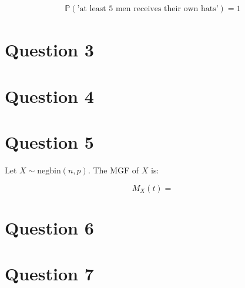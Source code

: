 \documentclass[12pt]{article}
\begin{document}
\begin{align*}
    \mathbb{P}(\text{'at least 5 men receives their own hats'}) = \boxed{1}
\end{align*}



\section*{Question 3}

\section*{Question 4}

\section*{Question 5}

Let $X \sim \text{negbin}(n,p)$. The MGF of $X$ is:

\begin{equation*}
    M_X (t) = 
\end{equation*}

\section*{Question 6}

\section*{Question 7}
\end{document}
